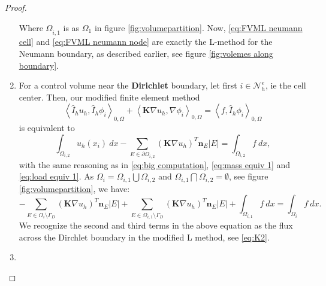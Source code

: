 \documentclass[../Main/main.tex]{subfiles}
\begin{document}
\begin{proof}
\begin{enumerate}
\begin{equation}
			\end{equation}
			Where $\Omega_{\hat{i},1}$ is as $\Omega_1$ in figure \ref{fig:volumepartition}. Now, \eqref{eq:FVML neumann cell} and \eqref{eq:FVML neumann node} are exactly the L-method for the Neumann boundary, as described earlier, see figure \ref{fig:volemes along boundary}.  
			\item For a control volume near the \textbf{Dirichlet} boundary, let first $i\in \mathcal{N}_h^e$, ie the cell center. Then, our modified finite element method
			\begin{equation}
				\left \langle \hat{I}_h u_h,\hat{I}_h \phi_i \right \rangle_{0,\Omega} +   \left \langle \pmb{K} \nabla u_h,\nabla \phi_i \right \rangle_{0,\Omega} = \left \langle f,\hat{I}_h \phi_i \right \rangle_{0,\Omega}
			\end{equation}   
			is equivalent to 
			\begin{equation} 
				\int_{\Omega_{i,2}} u_h (x_i) \ dx- \sum_{E\in \partial \Omega_{i,2}} (\pmb{K}\nabla u_h)^T \pmb{n}_E |E| = \int_{\Omega_{i,2}} f \ dx,
			\end{equation} 
			with the same reasoning as in \eqref{eq:big computation}, \eqref{eq:mass equiv 1} and \eqref{eq:load equiv 1}. As $\Omega_i = \Omega_{i,1}\bigcup \Omega_{i,2}$ and $\Omega_{i,1}\bigcap \Omega_{i,2}= \emptyset$, see figure \ref{fig:volumepartition}, we have:
			\begin{equation}
				-\sum_{E\in \Omega_i \setminus \Gamma_D}(\pmb{K}\nabla u_h)^T \pmb{n}_E |E| + \sum_{E\in \Omega_{i,1} \setminus \Gamma_D}(\pmb{K}\nabla u_h)^T \pmb{n}_E |E| + \int_{\Omega_{i,1}} f \ dx = \int_{\Omega_i} f \ dx.
			\end{equation}
			We recognize the second and third terms in the above equation as the flux across the Dirchlet boundary in the modified L method, see \eqref{eq:K2}.
			\item {}
		\end{enumerate}
	\end{proof}
\end{document}
